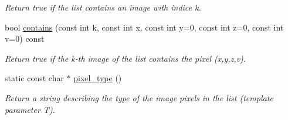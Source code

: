 \begin{DoxyCompactItemize}
\begin{DoxyCompactList}\small\item\em Return {\ttfamily true} if the list contains an image with indice k. \item\end{DoxyCompactList}\item 
\hypertarget{structcimg__library_1_1_c_img_list_a30c53742a1ac73335a69196072bd12ec}{
bool \hyperlink{structcimg__library_1_1_c_img_list_a30c53742a1ac73335a69196072bd12ec}{contains} (const int k, const int x, const int y=0, const int z=0, const int v=0) const }
\label{structcimg__library_1_1_c_img_list_a30c53742a1ac73335a69196072bd12ec}

\begin{DoxyCompactList}\small\item\em Return {\ttfamily true} if the k-\/th image of the list contains the pixel (x,y,z,v). \item\end{DoxyCompactList}\item 
\hypertarget{structcimg__library_1_1_c_img_list_ac0a9bcd06776586c0f3663cc1a387c11}{
static const char $\ast$ \hyperlink{structcimg__library_1_1_c_img_list_ac0a9bcd06776586c0f3663cc1a387c11}{pixel\_\-type} ()}
\label{structcimg__library_1_1_c_img_list_ac0a9bcd06776586c0f3663cc1a387c11}

\begin{DoxyCompactList}\small\item\em Return a string describing the type of the image pixels in the list (template parameter {\ttfamily T}). \item\end{DoxyCompactList}\end{DoxyCompactItemize}
